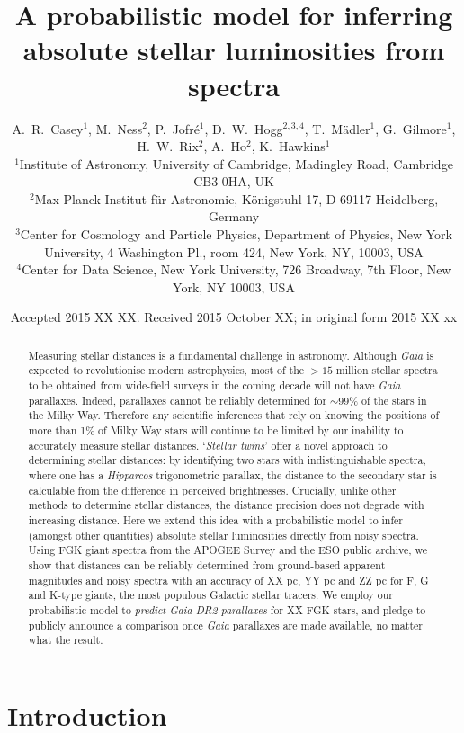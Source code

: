 \documentclass[useAMS,usenatbib]{mn2e}
\title[Inferring absolute stellar luminosities]{A probabilistic model for inferring absolute stellar luminosities from spectra}
\author[Casey et al.]{A.~R.~Casey$^1$, M.~Ness$^2$, P.~Jofr\'e$^1$, D.~W.~Hogg$^{2,3,4}$, T.~M\"adler$^1$, G.~Gilmore$^1$, H.~W.~Rix$^2$, \newauthor
A.~Ho$^2$, K.~Hawkins$^1$ \\ 
$^1$Institute of Astronomy, University of Cambridge, Madingley Road, Cambridge CB3 0HA, UK\\
$^2$Max-Planck-Institut f\"ur Astronomie, K\"onigstuhl 17, D-69117 Heidelberg, Germany\\
$^3$Center for Cosmology and Particle Physics, Department of Physics, New York University, 4 Washington Pl., room 424, New York, NY, 10003, USA\\
$^4$Center for Data Science, New York University, 726 Broadway, 7th Floor, New York, NY 10003, USA}
\begin{document}
\date{Accepted 2015 XX XX. Received 2015 October XX; in original form 2015 XX xx}

\pagerange{\pageref{firstpage}--\pageref{lastpage}} 

\maketitle

\label{firstpage}

\begin{abstract}
Measuring stellar distances is a fundamental challenge in astronomy. Although \textit{Gaia} is expected to revolutionise modern astrophysics, most of the $>15$ million stellar spectra to be obtained from wide-field surveys in the coming decade will not have \textit{Gaia} parallaxes. Indeed, parallaxes cannot be reliably determined for $\sim$99\% of the stars in the Milky Way. Therefore any scientific inferences that rely on knowing the positions of more than 1\% of Milky Way stars will continue to be limited by our inability to accurately measure stellar distances. `\textit{Stellar twins}' offer a novel approach to determining stellar distances: by identifying two stars with indistinguishable spectra, where one has a \textit{Hipparcos} trigonometric parallax, the distance to the secondary star is calculable from the difference in perceived brightnesses. Crucially, unlike other methods to determine stellar distances, the distance precision does not degrade with increasing distance. Here we extend this idea with a probabilistic model to infer (amongst other quantities) absolute stellar luminosities directly from noisy spectra. Using FGK giant spectra from the APOGEE Survey and the ESO public archive, we show that distances can be reliably determined from ground-based apparent magnitudes and noisy spectra with an accuracy of XX pc, YY pc and ZZ pc for F, G and K-type giants, the most populous Galactic stellar tracers. We employ our probabilistic model to \textit{predict Gaia DR2 parallaxes} for XX FGK stars, and pledge to publicly announce a comparison once \textit{Gaia} parallaxes are made available, no matter what the result.
\end{abstract}

\begin{keywords}
\end{keywords}

\section{Introduction}
\end{document}
